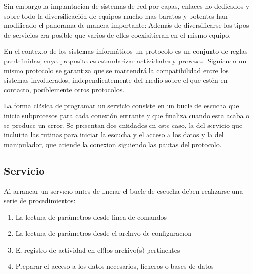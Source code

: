 \documentclass[a4paper,spanish,12pt]{book}
\begin{document}
Sin embargo la implantación de sistemas de red por capas, enlaces no dedicados y sobre todo la diversificación de equipos mucho mas baratos y potentes han modificado el panorama de manera importante: Además de diversificarse los tipos de servicios era posible que varios de ellos coexisitieran en el mismo equipo.

En el contexto de los sistemas informáticos un protocolo es un conjunto de reglas predefinidas, cuyo proposito es estandarizar actividades y procesos. Siguiendo un mismo protocolo se garantiza que se mantendrá la compatibilidad entre los sistemas involucrados, independientemente del medio sobre el que est\'en en contacto, posiblemente otros protocolos.

La forma cl\'asica de programar un servicio consiste en un bucle de escucha que inicia subprocesos para cada conexi\'on entrante y que finaliza cuando esta acaba o se produce un error. Se presentan dos entidades en este caso, la del servicio que incluiria las rutinas para iniciar la escucha y el acceso a los datos y la del manipulador, que atiende la conexion siguiendo las pautas del protocolo.

\subsection{Servicio}

Al arrancar un servicio antes de iniciar el bucle de escucha deben realizarse una serie de procedimientos:
\begin{enumerate}
	\item La lectura de parámetros desde linea de comandos
	\item La lectura de parámetros desde el archivo de configuracion
	\item El registro de actividad en el(los archivo(s) pertinentes
	\item Preparar el acceso a los datos necesarios, ficheros o bases de datos
\end{enumerate}
\end{document}
